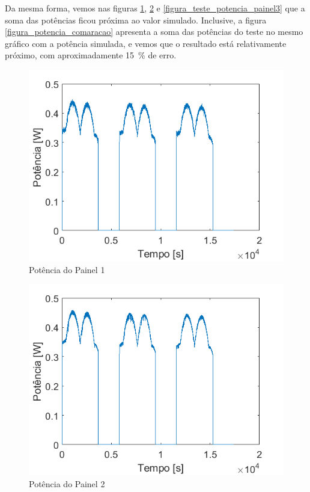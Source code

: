 Da mesma forma, vemos nas figuras \ref{figura_teste_potencia_painel1}, \ref{figura_teste_potencia_painel2} e \ref{figura_teste_potencia_painel3} que a soma das potências ficou próxima ao valor simulado. Inclusive, a figura \ref{figura_potencia_comaracao} apresenta a soma das potências do teste no mesmo gráfico com a potência simulada, e vemos que o resultado está relativamente próximo, com aproximadamente \SI{15}{\percent} de erro.

\begin{figure}[!htpb]
\begin{center}
\includegraphics[scale=0.5]{figures/testPanel1Power.png}
\caption{Potência do Painel 1}
\label{figura_teste_potencia_painel1}
\end{center}
\end{figure}

\begin{figure}[!htpb]
\begin{center}
\includegraphics[scale=0.5]{figures/testPanel2Power.png}
\caption{Potência do Painel 2}
\label{figura_teste_potencia_painel2}
\end{center}
\end{figure}

